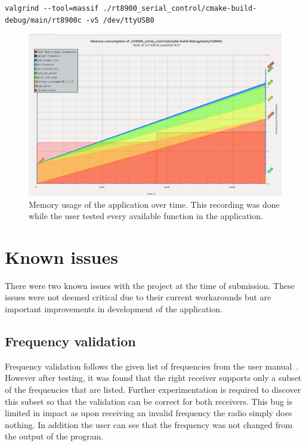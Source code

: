 \begin{verbatim}
valgrind --tool=massif ./rt8900_serial_control/cmake-build-debug/main/rt8900c -v5 /dev/ttyUSB0 
\end{verbatim}

\begin{figure}[H]
    \centering
    \includegraphics[width=1\textwidth]{img/memory_usage.png}
    \caption[Memory usage graph]{Memory usage of the application over time. This recording was done while the user tested every available function in the application.}
    \label{fig:memory_usage}
\end{figure}

\section{Known issues}
There were two known issues with the project at the time of submission. These issues were not deemed critical due to their current workarounds but are important improvements in development of the application.

\subsection*{Frequency validation}
Frequency validation follows the given list of frequencies from the user manual~\cite{user_manual}. However after testing, it was found that the right receiver supports only a subset of the frequencies that are listed. Further experimentation is required to discover this subset so that the validation can be correct for both receivers. This bug is limited in impact as upon receiving an invalid frequency the radio simply does nothing. In addition the user can see that the frequency was not changed from the output of the program.

